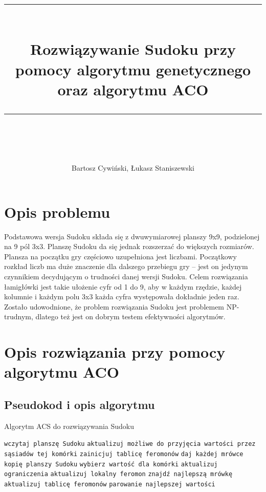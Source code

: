 \documentclass[11pt]{scrartcl} %
\title{	
	\normalfont\normalsize
	\rule{\linewidth}{0.5pt}\\ %
	\vspace{10pt} %
	{\huge Rozwiązywanie Sudoku przy pomocy algorytmu genetycznego oraz algorytmu ACO}\\ %
	\vspace{12pt} %
	\rule{\linewidth}{2pt}\\ %
}
\author{\LARGE Bartosz Cywiński, Łukasz Staniszewski} %
\date{} %
\begin{document}
\maketitle %

\section{Opis problemu}
Podstawowa wersja Sudoku składa się z dwuwymiarowej planszy 9x9, podzielonej na 9 pól 3x3. Planszę Sudoku da się jednak rozszerzać do większych rozmiarów. Plansza na początku gry częściowo uzupełniona jest liczbami. Początkowy rozkład liczb ma duże znaczenie dla dalszego przebiegu gry – jest on jedynym czynnikiem decydującym o trudności danej wersji Sudoku. Celem rozwiązania łamigłówki jest takie ułożenie cyfr od 1 do 9, aby w każdym rzędzie, każdej kolumnie i każdym polu 3x3 każda cyfra występowała dokładnie jeden raz. Zostało udowodnione, że problem rozwiązania Sudoku jest problemem NP-trudnym, dlatego też jest on dobrym testem efektywności algorytmów.

\section{Opis rozwiązania przy pomocy algorytmu ACO}

\subsection{Pseudokod i opis algorytmu}
\begin{algorithm}
\caption{Algorytm ACS do rozwiązywania Sudoku}\label{alg:cap}
\begin{algorithmic}[1]
\State \texttt{wczytaj planszę Sudoku}
	\State \texttt{aktualizuj możliwe do przyjęcia wartości przez sąsiadów tej komórki}
\EndFor
\State \texttt{zainicjuj tablicę feromonów}
	\State \texttt{daj każdej mrówce kopię planszy Sudoku}
				\State \texttt{wybierz wartość dla komórki}
				\State \texttt{aktualizuj ograniczenia}
				\State \texttt{aktualizuj lokalny feromon}
			\EndIf
		\EndFor
	\EndFor
	\State \texttt{znajdź najlepszą mrówkę}
	\State \texttt{aktualizuj tablicę feromonów}
	\State \texttt{parowanie najlepszej wartości}
\EndWhile

\end{algorithmic}
\end{algorithm}
\end{document}
